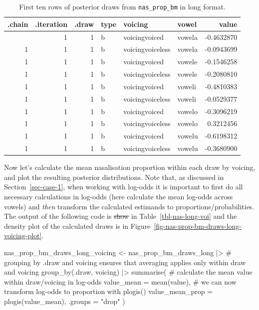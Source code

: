 \documentclass[
  authoryear,
  preprint,
  3p]{elsarticle}
\newenvironment{Shaded}{\begin{snugshade}}{\end{snugshade}}
\newcommand{\AttributeTok}[1]{\textcolor[rgb]{0.40,0.45,0.13}{#1}}
\newcommand{\CommentTok}[1]{\textcolor[rgb]{0.37,0.37,0.37}{#1}}
\newcommand{\FunctionTok}[1]{\textcolor[rgb]{0.28,0.35,0.67}{#1}}
\newcommand{\NormalTok}[1]{\textcolor[rgb]{0.00,0.23,0.31}{#1}}
\newcommand{\OtherTok}[1]{\textcolor[rgb]{0.00,0.23,0.31}{#1}}
\newcommand{\SpecialCharTok}[1]{\textcolor[rgb]{0.37,0.37,0.37}{#1}}
\newcommand{\StringTok}[1]{\textcolor[rgb]{0.13,0.47,0.30}{#1}}
\providecommand{\DIFadd}[1]{{\protect\color{blue}\uwave{#1}}} %
\providecommand{\DIFdel}[1]{{\protect\color{red}\sout{#1}}}                      %
\providecommand{\DIFaddbegin}{} %
\providecommand{\DIFaddend}{} %
\providecommand{\DIFdelbegin}{} %
\providecommand{\DIFdelend}{} %
\newcommand{\DIFscaledelfig}{0.5}
\newlength{\DIFdelgraphicswidth} %
\newlength{\DIFdelgraphicsheight} %
\newcommand{\DIFaddincludegraphics}[2][]{{\color{blue}\fbox{\DIFOincludegraphics[#1]{#2}}}} %
\newcommand{\DIFdelincludegraphics}[2][]{%
\sbox{\DIFdelgraphicsbox}{\DIFOincludegraphics[#1]{#2}}%
\settoboxwidth{\DIFdelgraphicswidth}{\DIFdelgraphicsbox} %
\settoboxtotalheight{\DIFdelgraphicsheight}{\DIFdelgraphicsbox} %
\scalebox{\DIFscaledelfig}{%
\parbox[b]{\DIFdelgraphicswidth}{\usebox{\DIFdelgraphicsbox}\\[-\baselineskip] \rule{\DIFdelgraphicswidth}{0em}}\llap{\resizebox{\DIFdelgraphicswidth}{\DIFdelgraphicsheight}{%
\setlength{\unitlength}{\DIFdelgraphicswidth}%
\begin{picture}(1,1)%
\thicklines\linethickness{2pt} %
{\color[rgb]{1,0,0}\put(0,0){\framebox(1,1){}}}%
{\color[rgb]{1,0,0}\put(0,0){\line( 1,1){1}}}%
{\color[rgb]{1,0,0}\put(0,1){\line(1,-1){1}}}%
\end{picture}%
}\hspace*{3pt}}} %
} %
\DeclareRobustCommand{\DIFaddbegin}{\DIFOaddbegin \let\includegraphics\DIFaddincludegraphics} %
\DeclareRobustCommand{\DIFaddend}{\DIFOaddend \let\includegraphics\DIFOincludegraphics} %
\DeclareRobustCommand{\DIFdelbegin}{\DIFOdelbegin \let\includegraphics\DIFdelincludegraphics} %
\DeclareRobustCommand{\DIFdelend}{\DIFOaddend \let\includegraphics\DIFOincludegraphics} %
\begin{document}
\begin{longtable}[]{@{}rrrlllr@{}}

\caption{\label{tbl-nas-draws}First ten rows of posterior draws from
\texttt{nas\_prop\_bm} in long format.}

\tabularnewline

\toprule\noalign{}
.chain & .iteration & .draw & type & voicing & vowel & value \\
\midrule\noalign{}
\endhead
\bottomrule\noalign{}
\endlastfoot
1 & 1 & 1 & b & voicingvoiced & vowela & -0.4632870 \\
1 & 1 & 1 & b & voicingvoiceless & vowela & -0.0943699 \\
1 & 1 & 1 & b & voicingvoiced & vowele & -0.1546258 \\
1 & 1 & 1 & b & voicingvoiceless & vowele & -0.2080810 \\
1 & 1 & 1 & b & voicingvoiced & voweli & -0.4810383 \\
1 & 1 & 1 & b & voicingvoiceless & voweli & -0.0529377 \\
1 & 1 & 1 & b & voicingvoiced & vowelo & -0.3096219 \\
1 & 1 & 1 & b & voicingvoiceless & vowelo & 0.3212456 \\
1 & 1 & 1 & b & voicingvoiced & vowelu & -0.6198312 \\
1 & 1 & 1 & b & voicingvoiceless & vowelu & -0.3680900 \\

\end{longtable}

Now let's calculate the mean nasalisation proportion within each draw by
voicing, and plot the resulting posterior distributions. Note that, as
discussed in Section~\ref{sec-case-1}, when working with log-odds it is
important to first do all necessary calculations in log-odds (here
calculate the mean log-odds across vowels) and \emph{then} transform the
calculated estimands to proportions/probabilities. The output of the
following code is \DIFdelbegin \DIFdel{show }\DIFdelend \DIFaddbegin \DIFadd{shown }\DIFaddend in Table~\ref{tbl-nas-long-voi} and the density
plot of the calculated draws is in
Figure~\ref{fig-nas-prop-bm-draws-long-voicing-plot}.

\begin{Shaded}
\begin{Highlighting}[]
\NormalTok{nas\_prop\_bm\_draws\_long\_voicing }\OtherTok{\textless{}{-}}\NormalTok{ nas\_prop\_bm\_draws\_long }\SpecialCharTok{|\textgreater{}} 
  \CommentTok{\# grouping by .draw and voicing ensures that averaging applies only within draw and voicing}
  \FunctionTok{group\_by}\NormalTok{(.draw, voicing) }\SpecialCharTok{|\textgreater{}} 
  \FunctionTok{summarise}\NormalTok{(}
    \CommentTok{\# calculate the mean value within draw/voicing in log{-}odds}
    \AttributeTok{value\_mean =} \FunctionTok{mean}\NormalTok{(value),}
    \CommentTok{\# we can now transform log{-}odds to proportion with plogis()}
    \AttributeTok{value\_mean\_prop =} \FunctionTok{plogis}\NormalTok{(value\_mean),}
    \AttributeTok{.groups =} \StringTok{"drop"}
\NormalTok{  )}
\end{Highlighting}
\end{Shaded}
\end{document}
